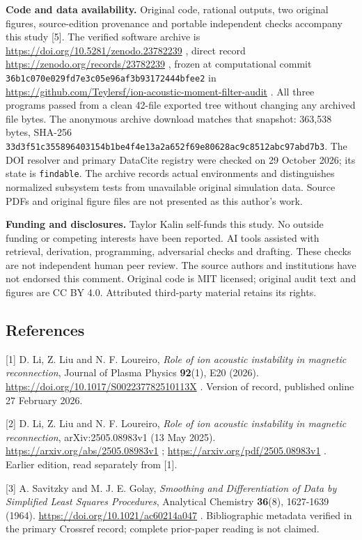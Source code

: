 \textbf{Code and data availability.} Original code, rational outputs,
two original figures, source-edition provenance and portable independent
checks accompany this study {[}5{]}. The verified software archive is
\url{https://doi.org/10.5281/zenodo.23782239} , direct record
\url{https://zenodo.org/records/23782239} , frozen at computational
commit \nolinkurl{36b1c070e029fd7e3c05e96af3b93172444bfee2} in
\url{https://github.com/Teylersf/ion-acoustic-moment-filter-audit} . All
three programs passed from a clean 42-file exported tree without
changing any archived file bytes. The anonymous archive download matches
that snapshot: 363,538 bytes, SHA-256
\nolinkurl{33d3f51c355896403154b1be4f4e13a2a652f69e80628ac9c8512abc97abd7b3}.
The DOI resolver and primary DataCite registry were checked on 29
October 2026; its state is \nolinkurl{findable}. The archive records actual
environments and distinguishes normalized subsystem tests from
unavailable original simulation data. Source PDFs and original figure
files are not presented as this author's work.

\textbf{Funding and disclosures.} Taylor Kalin self-funds this study. No
outside funding or competing interests have been reported. AI tools
assisted with retrieval, derivation, programming, adversarial checks and
drafting. These checks are not independent human peer review. The source
authors and institutions have not endorsed this comment. Original code
is MIT licensed; original audit text and figures are CC BY 4.0.
Attributed third-party material retains its rights.

\clearpage
\begingroup\small\raggedright
\subsection{References}\label{references}

{[}1{]} D. Li, Z. Liu and N. F. Loureiro, \emph{Role of ion acoustic
instability in magnetic reconnection}, Journal of Plasma Physics
\textbf{92}(1), E20 (2026).
\url{https://doi.org/10.1017/S002237782510113X} . Version of record,
published online 27 February 2026.

{[}2{]} D. Li, Z. Liu and N. F. Loureiro, \emph{Role of ion acoustic
instability in magnetic reconnection}, arXiv:2505.08983v1 (13 May 2025).
\url{https://arxiv.org/abs/2505.08983v1} ;
\url{https://arxiv.org/pdf/2505.08983v1} . Earlier edition, read
separately from {[}1{]}.

{[}3{]} A. Savitzky and M. J. E. Golay, \emph{Smoothing and
Differentiation of Data by Simplified Least Squares Procedures},
Analytical Chemistry \textbf{36}(8), 1627-1639 (1964).
\url{https://doi.org/10.1021/ac60214a047} . Bibliographic metadata
verified in the primary Crossref record; complete prior-paper reading is
not claimed.

